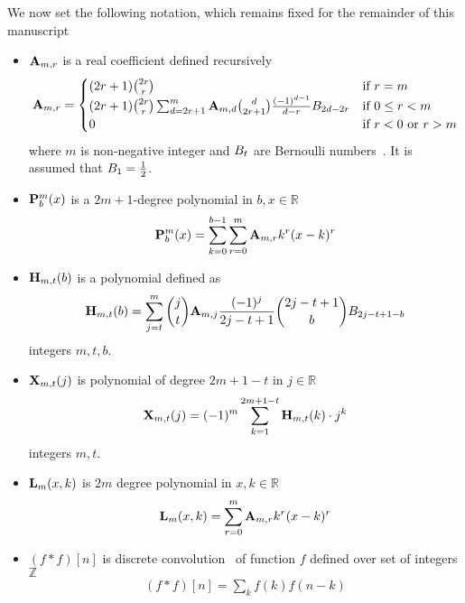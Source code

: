 We now set the following notation, which remains fixed for the remainder of this manuscript
\begin{itemize}
    \setlength\itemsep{1.6em}
    \item ${\mathbf{A}} \sb{m,r}$ is a real coefficient defined recursively
    \begin{equation}
        \label{eq:def_coeff_a}
        {\mathbf{A}} \sb{m,r} =
        \begin{cases}
        (2r+1)
            \binom{2r}{r} & \text{if } r=m \\
            (2r+1) \binom{2r}{r} \sum_{d=2r+1}^{m} {\mathbf{A}} \sb{m,d} \binom{d}{2r+1} \frac{(-1)^{d-1}}{d-r}
            {B}\sb{2d-2r} & \text{if } 0 \leq r<m \\
            0 & \text{if } r<0 \text{ or } r>m
        \end{cases}
    \end{equation}
    where $m$ is non-negative integer and ${B}\sb{t}$ are Bernoulli numbers~\cite{WeissteinBernoulli}.
    It is assumed that ${B}\sb{1}=\frac{1}{2}$.

    \item ${\mathbf{P}}\sp{m} \sb{b}(x)$ is a $2m+1$-degree polynomial in $b,x\in\mathbb{R}$
    \begin{equation}
        \label{eq:def_polynomial_p}
        {\mathbf{P}}\sp{m} \sb{b}(x) = \sum_{k=0}^{b-1} \sum_{r=0}^{m} {\mathbf{A}} \sb{m,r} k^r(x-k)^r
    \end{equation}

    \item ${\mathbf{H}} \sb{m,t} (b)$ is a polynomial defined as
    \begin{equation}
        \label{eq:def_coeff_h}
        {\mathbf{H}} \sb{m,t} (b)
        = \sum_{j=t}^{m} \binom{j}{t} {\mathbf{A}} \sb{m,j} \frac{(-1)^j}{2j-t+1} \binom{2j-t+1}{b} {B}\sb{2j-t+1-b}
    \end{equation}
    integers $m,t,b$.

    \item ${\mathbf{X}}\sb{m,t} (j)$ is polynomial of degree $2m+1-t$ in $j\in\mathbb{R}$
    \begin{equation}
        \label{eq:def_coeff_x}
        {\mathbf{X}}\sb{m,t} (j) = (-1)^m \sum_{k=1}^{2m+1-t} {\mathbf{H}} \sb{m,t} (k) \cdot j^k
    \end{equation}
    integers $m,t$.

    \item ${\mathbf{L}}\sb{m}(x,k)$ is $2m$ degree polynomial in $x,k\in\mathbb{R}$
    \begin{equation}
        \label{eq:def_polynomial_l}
        {\mathbf{L}}\sb{m}(x,k) = \sum_{r=0}^{m} {\mathbf{A}} \sb{m,r} k^r(x-k)^r
    \end{equation}

    \item $(f\ast f)[n]$ is discrete convolution~\cite{damelin_discrete_convolution} of function $f$ defined over set of integers $\mathbb{Z}$
    \begin{align*}
    (f\ast f)[n]
        = \sum_{k} f(k) f(n-k)
    \end{align*}
\end{itemize}
